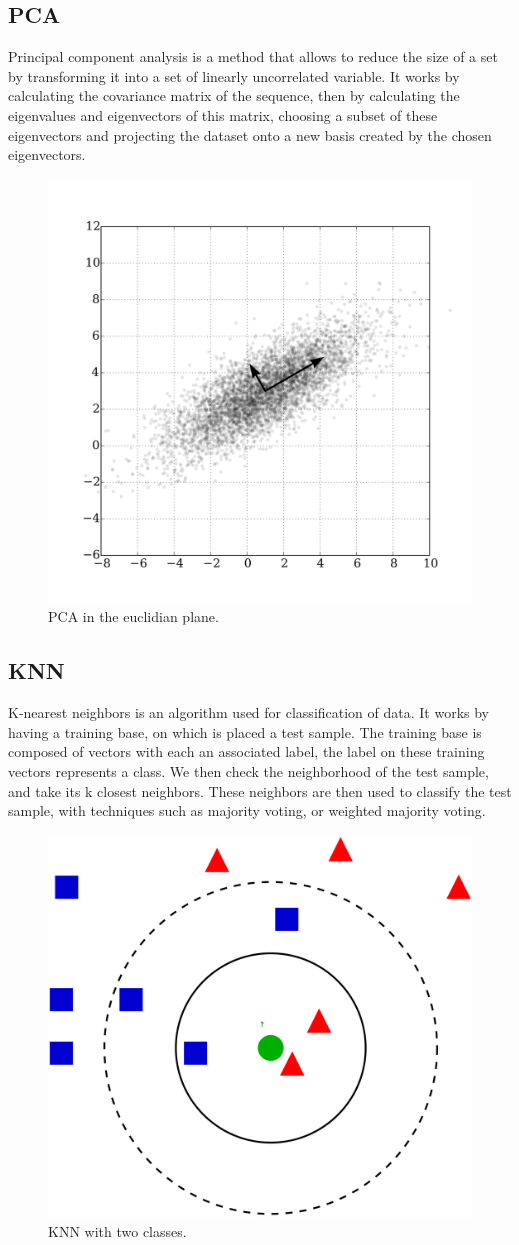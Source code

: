 \documentclass[%
  report,%
  10pt,%
  a4paper,%
  fleqn,%
  oneside,%
  sumario = tradicional,%
  chapter = TITLE,%
  section = TITLE,%
]{abntex2}
\begin{document}
\subsection{PCA}

Principal component analysis is a method that allows to reduce the size of a set by transforming it into a set of linearly uncorrelated variable.
It works by calculating the covariance matrix of the sequence, then by calculating the eigenvalues and eigenvectors of this matrix, choosing a subset of these eigenvectors and projecting the dataset onto a new basis created by the chosen eigenvectors.

\begin{figure}[H]
  \centering
  \caption{PCA in the euclidian plane.}
  \label{fig:pca}
  \includegraphics[width = 0.5\columnwidth]{./Figuras/pca}
\end{figure}

\subsection{KNN}

K-nearest neighbors is an algorithm used for classification of data.
It works by having a training base, on which is placed a test sample.
The training base is composed of vectors with each an associated label, the label on these training vectors represents a class.
We then check the neighborhood of the test sample, and take its k closest neighbors.
These neighbors are then used to classify the test sample, with techniques such as majority voting, or weighted majority voting.

\begin{figure}[H]
  \centering
  \caption{KNN with two classes.}
  \label{fig:knn}
  \includegraphics[width = 0.5\columnwidth]{./Figuras/knn}
\end{figure}
\end{document}
